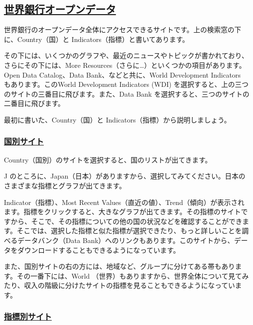 \documentclass[
  xelatex, ja=standard]{bxjsbook}
\theoremstyle{definition}
\theoremstyle{definition}
\theoremstyle{definition}
\theoremstyle{definition}
\theoremstyle{remark}
\begin{document}
\hypertarget{ux4e16ux754cux9280ux884cux30aaux30fcux30d7ux30f3ux30c7ux30fcux30bf-1}{%
\subsection{\texorpdfstring{\href{https://data.worldbank.org}{世界銀行オープンデータ}}{世界銀行オープンデータ}}\label{ux4e16ux754cux9280ux884cux30aaux30fcux30d7ux30f3ux30c7ux30fcux30bf-1}}

世界銀行のオープンデータ全体にアクセスできるサイトです。上の検索窓の下に、Country（国）と Indicators（指標）と書いてあります。

その下には、いくつかのグラフや、最近のニュースやトピックが書かれており、さらにその下には、More Resources（さらに\ldots）といくつかの項目があります。Open Data Catalog、Data Bank、などと共に、World Development Indicators もあります。このWorld Development Indicators (WDI) を選択すると、上の三つのサイトの三番目に飛びます。また、Data Bank を選択すると、三つのサイトの二番目に飛びます。

最初に書いた、Country（国）と Indicators（指標）から説明しましょう。

\hypertarget{ux56fdux5225ux30b5ux30a4ux30c8-1}{%
\subsubsection{\texorpdfstring{\href{https://data.worldbank.org/country}{国別サイト}}{国別サイト}}\label{ux56fdux5225ux30b5ux30a4ux30c8-1}}

Country（国別）のサイトを選択すると、国のリストが出てきます。

J のところに、Japan（日本）がありますから、選択してみてください。日本のさまざまな指標とグラフが出てきます。

Indicator（指標）、Most Recent Values（直近の値）、Trend（傾向）が表示されます。指標をクリックすると、大きなグラフが出てきます。その指標のサイトですから、そこで、その指標についての他の国の状況などを確認することができます。そこでは、選択した指標と似た指標が選択できたり、もっと詳しいことを調べるデータバンク（Data Bank）へのリンクもあります。このサイトから、データをダウンロードすることもできるようになっています。

また、国別サイトの右の方には、地域など、グループに分けてある帯もあります。その一番下には、World （世界）もありますから、世界全体について見てみたり、収入の階級に分けたサイトの指標を見ることもできるようになっています。

\hypertarget{ux6307ux6a19ux5225ux30b5ux30a4ux30c8-1}{%
\subsubsection{\texorpdfstring{\href{https://data.worldbank.org/indicator}{指標別サイト}}{指標別サイト}}\label{ux6307ux6a19ux5225ux30b5ux30a4ux30c8-1}}
\end{document}
